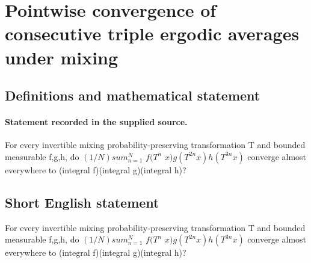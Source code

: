 \documentclass[11pt]{article}
\begin{document}
\section*{Pointwise convergence of consecutive triple ergodic averages under mixing}\label{30007168}
\subsection{Definitions and mathematical statement}
\paragraph{Statement recorded in the supplied source.}
For every invertible mixing probability-preserving transformation T and bounded measurable f,g,h, do $(1/N)sum_{n=1}^N$ $f(T^n$ $x)g(T^{2n}x)h(T^{3n}x)$ converge almost everywhere to (integral f)(integral g)(integral h)?
\subsection{Short English statement}
For every invertible mixing probability-preserving transformation T and bounded measurable f,g,h, do $(1/N)sum_{n=1}^N$ $f(T^n$ $x)g(T^{2n}x)h(T^{3n}x)$ converge almost everywhere to (integral f)(integral g)(integral h)?
\end{document}
